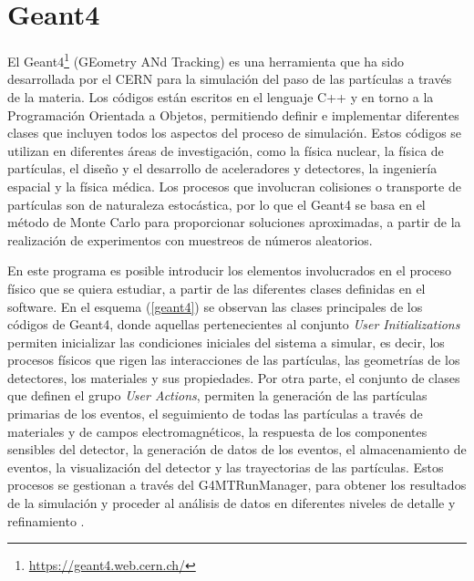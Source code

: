 \documentclass[12pt,oneside,openany,letter]{book}
\begin{document}
\chapter{Geant4}\label{apendice}

El Geant4\footnote{\url{https://geant4.web.cern.ch/}} (GEometry ANd Tracking) es una herramienta que ha sido desarrollada por el CERN para la simulaci\'on del paso de las part\'iculas a trav\'es de la materia. 
Los c\'odigos est\'an escritos en el lenguaje C++ y en torno a la Programaci\'on Orientada a Objetos, permitiendo definir e implementar diferentes clases que incluyen todos los aspectos del proceso de simulación. Estos c\'odigos se utilizan en diferentes \'areas de investigaci\'on, como la f\'isica nuclear, la f\'isica de part\'iculas, el dise\~no y el desarrollo de aceleradores y detectores, la ingenier\'ia espacial y la f\'isica m\'edica. Los procesos que involucran colisiones o transporte de part\'iculas son de naturaleza estoc\'astica, por lo que el Geant4 se basa en el m\'etodo de Monte Carlo para proporcionar soluciones aproximadas, a partir de la realizaci\'on de experimentos con muestreos de n\'umeros aleatorios.

En este programa es posible introducir los elementos involucrados en el proceso f\'isico que se quiera estudiar, a partir de las diferentes clases definidas en el software. En el esquema (\ref{geant4}) se observan las clases principales de los c\'odigos de Geant4, donde aquellas pertenecientes al conjunto \textit{User Initializations} permiten inicializar las condiciones iniciales del sistema a simular, es decir, los procesos físicos que rigen las interacciones de las partículas, las geometr\'ias de los detectores, los materiales y sus propiedades. Por otra parte, el conjunto de clases que definen el grupo \textit{User Actions}, permiten la generación de las partículas primarias de los eventos, el seguimiento de todas las partículas a través de materiales y de campos electromagnéticos, la respuesta de los componentes sensibles del detector, la generación de datos de los eventos, el almacenamiento de eventos, la visualización del detector y las trayectorias de las partículas. Estos procesos se gestionan a trav\'es del G4MTRunManager, para obtener los resultados de la simulaci\'on y proceder al análisis de datos en diferentes niveles de detalle y refinamiento \cite{Geant4}. 
\end{document}
